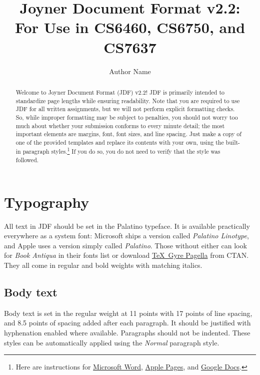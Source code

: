 \documentclass{jdf}
\title{Joyner Document Format v2.2:\\
For Use in CS6460, CS6750, and CS7637}
\author{Author Name}
\begin{document}
\def\tightlist{}

\maketitle

\begin{abstract}
    Welcome to Joyner Document Format (JDF) v2.2! JDF is primarily
    intended to standardize page lengths while ensuring readability.
    Note that you are required to use JDF for all written assignments,
    but we will not perform explicit formatting checks. So, while
    improper formatting may be subject to penalties, you should not
    worry too much about whether your submission conforms to every
    minute detail; the most important elements are margins, font, font
    sizes, and line spacing. Just make a copy of one of the provided
    templates and replace its contents with your own, using the built-in
    paragraph styles.\footnote{Here are instructions for
      \href{https://support.office.com/en-us/article/Video-Using-Styles-in-Word-9db4c0f4-2754-4294-9758-c14a0abd8cfa}{Microsoft
      Word},
      \href{https://support.apple.com/guide/pages/intro-to-paragraph-styles-tanaa39b0aa3/mac}{Apple
      Pages}, and
      \href{https://www.bazroberts.com/2016/04/19/google-docs-paragraph-styles-headings/}{Google
      Docs}.} If you do so, you do not need to verify that the style was
    followed.
\end{abstract}

\hypertarget{typography}{%
\section{Typography}\label{typography}}

All text in JDF should be set in the Palatino typeface. It is available
practically everywhere as a system font: Microsoft ships a version
called \emph{Palatino Linotype}, and Apple uses a version simply called
\emph{Palatino}. Those without either can look for \emph{Book Antiqua}
in their fonts list or download
\href{https://www.ctan.org/tex-archive/fonts/tex-gyre/opentype}{\TeX~Gyre
Pagella} from CTAN. They all come in regular and bold weights with
matching italics.

\hypertarget{body-text}{%
\subsection{Body text}\label{body-text}}

Body text is set in the regular weight at 11 points with 17 points of
line spacing, and 8.5 points of spacing added after each paragraph. It
should be justified with hyphenation enabled where available. Paragraphs
should not be indented. These styles can be automatically applied using
the \emph{Normal} paragraph style.
\end{document}
